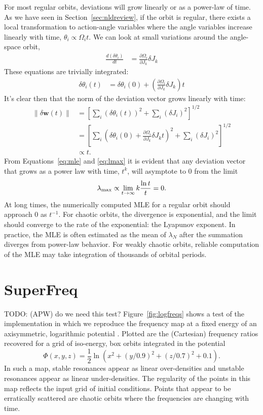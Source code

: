 \documentclass[letterpaper,12pt,preprint]{aastex}
\newcommand{\bs}[1]{\boldsymbol{#1}}
\newcommand{\todo}[2]{{\color{red} TODO: (\MakeUppercase{#1}) #2}}
\begin{document}
For most regular orbits, deviations will grow linearly or as a power-law of time. As we have seen in Section~\ref{sec:nldreview}, if the orbit is regular, there exists a local transformation to action-angle variables where the angle variables increase linearly with time, $\theta_i \propto \Omega_i t$. We can look at small variations around the angle-space orbit,
\begin{align}
	\frac{d (\delta \theta_i)}{dt} &= \frac{\partial \Omega_i}{\partial J_k} \delta J_k
\end{align}
These equations are trivially integrated:
\begin{align}
	\delta \theta_i(t) &= \delta \theta_i(0) + \left(\frac{\partial \Omega_i}{\partial J_k} \delta J_k \right) t
\end{align}
It's clear then that the norm of the deviation vector grows linearly with time:
\begin{align}
	\|\delta \bs{w}(t)\| &= \left[\sum_i (\delta \theta_i(t))^2 + \sum_i (\delta J_i)^2\right]^{1/2}\\
	&= \left[\sum_i \left(\delta \theta_i(0) + \frac{\partial \Omega_i}{\partial J_k} \delta J_k t\right)^2 + \sum_i (\delta J_i)^2\right]^{1/2}\\
	&\propto t.
\end{align}
From Equations~\ref{eq:mle} and \ref{eq:lmax} it is evident that any deviation vector that grows as a power law with time, $t^k$, will asymptote to 0 from the limit 
\begin{equation}
	\lambda_{\rm max} \propto \lim_{t\rightarrow \infty} k \frac{\ln t}{t} = 0.
\end{equation}
At long times, the numerically computed MLE for a regular orbit should approach 0 as $t^{-1}$. For chaotic orbits, the divergence is exponential, and the limit should converge to the rate of the exponential: the Lyapunov exponent. In practice, the MLE is often estimated as the mean of $\lambda_N$ after the summation diverges from power-law behavior. For weakly chaotic orbits, reliable computation of the MLE may take integration of thousands of orbital periods.

\section{SuperFreq}\label{sec:naffapdx}

\todo{apw}{do we need this test?}
Figure~\ref{fig:logfreqs} shows a test of the implementation in which we reproduce the frequency map at a fixed energy of an axisymmetric, logarithmic potential \cite[][pg. 260, Figure~3.45]{binneytremaine}. Plotted are the (Cartesian) frequency ratios recovered for a grid of iso-energy, box orbits integrated in the potential
\begin{equation}
	\Phi(x,y,z) = \frac{1}{2}\ln\left(x^2 + (y/0.9)^2 + (z/0.7)^2 + 0.1\right). \label{eq:logpotential}
\end{equation}
In such a map, stable resonances appear as linear over-densities and unstable resonances appear as linear under-densities. The regularity of the points in this map reflects the input grid of initial conditions. Points that appear to be erratically scattered are chaotic orbits where the frequencies are changing with time.
\end{document}
